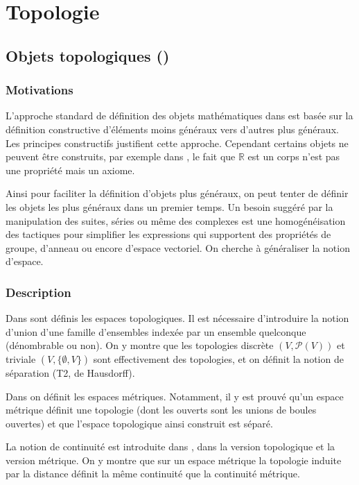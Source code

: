 \section{Topologie}

\subsection{Objets topologiques ()}

\subsubsection{Motivations}

L'approche standard de définition des objets mathématiques dans \Coq{} est basée sur la définition constructive d'éléments moins généraux vers d'autres plus généraux. Les principes constructifs justifient cette approche. Cependant certains objets ne peuvent être construits, par exemple dans , le fait que $\mathbb{R}$ est un corps n'est pas une propriété mais un axiome.

Ainsi pour faciliter la définition d'objets plus généraux, on peut tenter de définir les objets les plus généraux dans un premier temps. Un besoin suggéré par la manipulation des suites, séries ou même des complexes est une homogénéisation des tactiques pour simplifier les expressions qui supportent des propriétés de groupe, d'anneau ou encore d'espace vectoriel. On cherche à généraliser la notion d'espace.

\subsubsection{Description}

Dans  sont définis les espaces topologiques. Il est nécessaire d'introduire la notion d'union d'une famille d'ensembles indexée par un ensemble quelconque (dénombrable ou non). On y montre que les topologies discrète $(V,\mathcal{P}(V))$ et triviale $(V,\{\emptyset,V\})$ sont effectivement des topologies, et on définit la notion de séparation (T2, de Hausdorff).

Dans  on définit les espaces métriques. Notamment, il y est prouvé qu'un espace métrique définit une topologie (dont les ouverts sont les unions de boules ouvertes) et que l'espace topologique ainsi construit est séparé.

La notion de continuité est introduite dans , dans la version topologique et la version métrique. On y montre que sur un espace métrique la topologie induite par la distance définit la même continuité que la continuité métrique.

